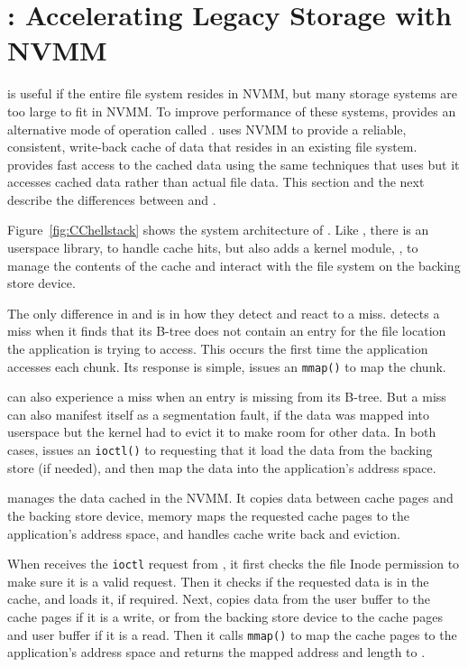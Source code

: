 \section{\CChell{}: Accelerating Legacy Storage with NVMM}
\label{sec:overview}

\DAChell{} is useful if the entire file system resides in NVMM, but many
storage systems are too large to fit in NVMM.  To improve
performance of these systems, \Chell{} provides an alternative mode of
operation called \CChell{}.  \CChell{} uses NVMM to provide a reliable,
consistent, write-back cache of data that resides in an existing file system.
\CChell{} provides fast access to the cached data using the same techniques
that \DAChell{} uses but it accesses cached data rather than actual file data.
This section and the next describe the differences between \CChell{} and \DAChell{}.

Figure~\ref{fig:CChellstack} shows the system architecture of \CChell{}.
Like \DAChell{}, there is an userspace library, \lib{} to handle cache
hits, but \CChell{} also adds a kernel module, \drv{}, to
manage the contents of the cache and interact with the file system on the
backing store device.

The only difference in \libd{} and \lib{} is in
how they detect and react to a miss.  \Libd{} detects a miss when it
finds that its B-tree does not contain an entry for the file location the
application is trying to access.  This occurs the first time the application
accesses each chunk.  Its response is simple, issues an \texttt{mmap()} to map the chunk.

\Lib{} can also experience a miss when an entry is missing from its B-tree.
But a miss can also manifest itself as a segmentation fault, if the data was
mapped into userspace but the kernel had to evict it to make room for other data.
In both cases, \lib{} issues an \texttt{ioctl()} to \drv{} requesting that
it load the data from the backing store (if needed), and then map the data into
the application's address space.

\Drv{} manages the data cached in the NVMM.
It copies data between cache pages and the backing store device,
memory maps the requested cache pages to the application's address space,
and handles cache write back and eviction.

When \drv{} receives the \texttt{ioctl} request from \lib{},
it first checks the
file Inode permission to make sure it is a valid request.  Then it checks if 
the requested data is in the cache,
and loads it, if required.
Next, \drv{} copies data from the user buffer to the cache pages if it is
a write, or from the backing store device to the cache pages and user buffer if 
it is a read. Then it calls \texttt{mmap()} to map the cache pages to
the application's address space and returns the mapped address and length
to \lib{}.

